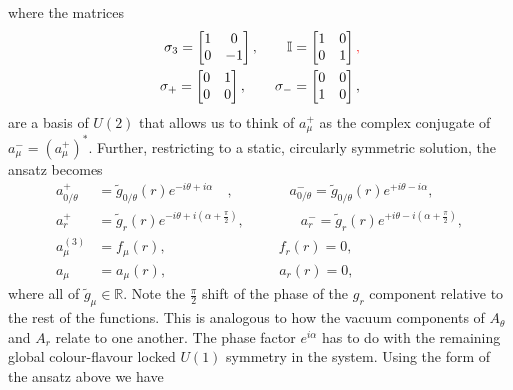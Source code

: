     where the matrices
    \begin{align}
        \sigma_3 = \begin{bmatrix}
            1 & 0 \\
            0 & -1 \\
        \end{bmatrix}, \qquad \mathbb{I}= \begin{bmatrix}
            1 & 0\\
            0 & 1\\
        \end{bmatrix}\textcolor{red}{,} \\
        \sigma_+ =\begin{bmatrix}
            0 & 1\\
            0 & 0\\
        \end{bmatrix}, \qquad \sigma_- = \begin{bmatrix}
            0 &0\\
            1 &0\\
        \end{bmatrix},
    \end{align}
    are a basis of $U(2)$ that allows us to think of $a_{\mu}^{+}$ as the complex conjugate of $a_{\mu}^{-}= (a_{\mu}^{+})^*$. Further, restricting to a static, circularly symmetric solution, the ansatz becomes
\begin{align}
    a_{0/\theta}^{+} &= \tilde{g}_{0/\theta}(r)e^{-i \theta + i\alpha}\quad, \qquad \qquad a_{0/\theta}^{-} = \tilde{g}_{0/\theta}(r)e^{+i \theta - i\alpha}, \label{eq:U2_gauge_ansatz_static_1}\\
    a_{r}^{+} &= \tilde{g}_{r}(r)e^{-i \theta + i\left(\alpha + \frac{\pi}{2} \right)}, \qquad \qquad a_{r}^{-} = \tilde{g}_{r}(r)e^{+i \theta - i\left(\alpha + \frac{\pi}{2} \right)}, \label{eq:U2_gauge_ansatz_static_2}\\
    a_{\mu}^{(3)}&= f_{\mu}(r),\qquad \qquad \qquad \qquad f_r(r)=0, \label{eq:U2_gauge_ansatz_static_3}\\
    a_{\mu}&= a_{\mu}(r),\qquad \qquad \qquad \qquad a_r(r)=0\label{eq:U2_gauge_ansatz_static_4},
\end{align}
where all of $\tilde{g}_{\mu} \in \mathbb{R}$. Note the $\frac{\pi}{2}$ shift of the phase of the $g_r$ component relative to the rest of the functions. This is analogous to how the vacuum components of $A_{\theta}$ and $A_r$ relate to one another. The phase factor $e^{i \alpha}$ has to do with the remaining global colour-flavour locked $U(1)$ symmetry in the system. Using the form of the ansatz above we have
